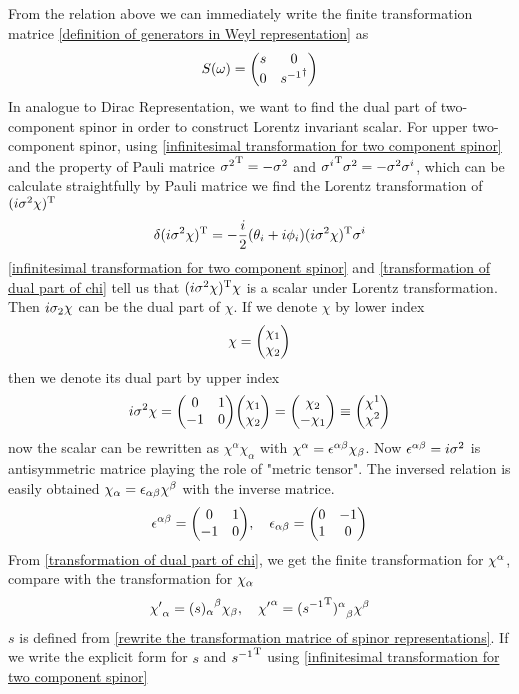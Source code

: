From the relation above we can immediately write the finite transformation matrice \eqref{definition of generators in Weyl representation} as
\begin{equation} \label{rewrite the transformation matrice of spinor representations}
S(\w) = \mqty(
s &
0                           \\
0                           &
{s^{-1}}^{\dagger})
\end{equation}
In analogue to Dirac Representation, we want to find the dual part of two-component spinor in order to construct Lorentz invariant scalar. For upper two-component spinor, using \eqref{infinitesimal transformation for two component spinor} and the property of Pauli matrice ${\sigma^{2}}^{\text{T}}=-\sigma^{2}$ and ${\sigma^{i}}^{\text{T}}\sigma^{2} = -\sigma^{2}\sigma^{i}$, which can be calculate straightfully by Pauli matrice
we find the Lorentz transformation of $(i\sigma^2\chi)^{\text{T}}$
\begin{equation} \label{transformation of dual part of chi}
\delta{(i\sigma^2\chi)^{\text{T}}}
=-\frac{i}{2} (\theta_i + i \phi_i)  (i\sigma^2 \chi)^{\text{T}} \sigma^{i}
\end{equation}
\eqref{infinitesimal transformation for two component spinor} and \eqref{transformation of dual part of chi} tell us that
$(i\sigma^2\chi)^{\text{T}}\chi$ is a scalar under Lorentz transformation. Then $i\sigma_2\chi$ can be the dual part of $\chi$.
If we denote $\chi$ by lower index
\begin{equation}
  \chi = \mqty(\chi_1 \\ \chi_2)
\end{equation}
then we denote its dual part by upper index
\begin{equation}
  i\s^{2}\chi = \mqty(0 & 1 \\ -1 & 0)
\mqty(\chi_1 \\ \chi_2)
=\mqty(\chi_2 \\ -\chi_1)
\equiv \mqty(\chi^{1}\\\chi^{2})
\end{equation}
now the scalar can be rewritten as $\chi^{\alpha} \chi_{\alpha}$
with $\chi^{\alpha} =  \epsilon^{\alpha\beta}\chi_{\beta}$. Now $\epsilon^{\alpha\beta} =i\sigma^{2} $ is antisymmetric matrice playing the role of "metric tensor". The inversed relation is easily obtained $\chi_{\alpha} = \epsilon_{\alpha\beta}\chi^{\beta}$ with the inverse matrice.
\begin{equation}\label{definition of undotted antisymmetric tensor}
  \e^{\a\be} = \mqty(0 & 1 \\ -1 & 0),\quad
\e_{\a\be} =\mqty(0 & -1 \\ 1 & 0)
\end{equation}
From \eqref{transformation of dual part of chi}, we get the finite transformation for $\chi^{\alpha}$, compare with the transformation for $\chi_{\alpha}$
\begin{equation} \label{Lorentz transformation for chi}
{\chi'}_{\alpha} = {(s)_{\alpha}}^{\beta}\chi_{\beta}
,\quad
{\chi'}^{\alpha} = {({s^{-1}}^{\text{T}})^{\alpha}}_{\beta}\chi^{\beta}
\end{equation}
$s$ is defined from \eqref{rewrite the transformation matrice of spinor representations}. If we write the explicit form for $s$ and
${s^{-1}}^{\text{T}}$ using \eqref{infinitesimal transformation for two component spinor}

